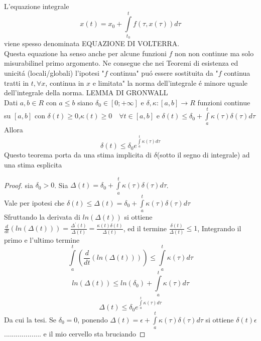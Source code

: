 \observation
L'equazione integrale 
$$x(t)=x_0+\int\limits_{t_0}^{t}f(\tau,x(\tau))d\tau$$
viene spesso denominata EQUAZIONE DI VOLTERRA.\\
Questa equazione ha senso anche per alcune funzioni $f$ non non continue ma solo misurabilinel primo argomento. Ne consegue che nei Teoremi di esistenza ed unicit\'a (locali/globali) l'ipotesi "$f$ continua" pu\'o essere sostituita da "$f$ continua tratti in $t, \forall x$, continua in $x$ e limitata"
\observation
la norma dell'integrale \'e minore uguale dell'integrale della norma.
\proposition LEMMA DI GRONWALL\\
Dati $a,b\in R$ con $a\le b$ siano $\delta_0\in \left[ 0;+\infty \right]$ e $\delta,\kappa:\left[a,b\right]\to R$ funzioni continue su $\left[a,b\right]$ con $\delta(t)\ge 0$,$\kappa(t)\ge 0 \quad \forall t\in\left[ a,b\right] $ e $\delta(t)\le \delta_0+\int\limits_{a}^{t}\kappa(\tau)\delta(\tau)d\tau$Allora $$\delta(t)\le\delta_0e^{\int\limits_a^t\kappa(\tau)d\tau}$$
Questo teorema porta da una stima implicita di $\delta$(sotto il segno di integrale) ad una stima esplicita 
\begin{proof}
	sia $\delta_0 > 0$. Sia $\Delta(t)=\delta_0+\int\limits_a^t\kappa(\tau)\delta(\tau)d\tau$.\\
	Vale per ipotesi che $\delta(t)\le\Delta(t)=\delta_0+\int\limits_a^t\kappa(\tau)\delta(\tau)d\tau$\\
	Sfruttando la derivata di $ln(\Delta(t))$ si ottiene $\frac{d}{dt}(ln(\Delta(t)))= \frac{\Delta^{'}(t)}{\Delta(t)}=\frac{\kappa(t)\delta(t)}{\Delta(t)}$, ed il termine $\frac{\delta(t)}{\Delta(t)}\le 1$, Integrando il primo e l'ultimo termine
	$$\int\limits_a^t\left( \frac{d}{dt}\left(ln(\Delta(t))\right) \right)\le\int\limits_a^t\kappa(\tau)d\tau$$
	$$ln(\Delta(t))\le ln(\delta_0)+\int\limits_a^t\kappa(\tau)d\tau$$
	$$ \Delta(t)\le\delta_0e^{\int\limits_a^t\kappa(\tau)d\tau} $$
	Da cui la tesi.
	Se $\delta_0=0$, ponendo $\Delta(t)=\epsilon+\int\limits_a^t\kappa(\tau)\delta(\tau)d\tau$ si ottiene $\delta(t)\epsilon$ ................... e il mio cervello sta bruciando
\end{proof}

